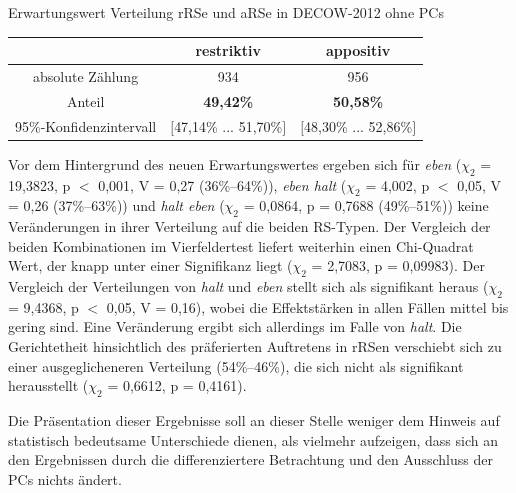 \begin{exe}
	\ex\label{805}Erwartungswert Verteilung rRSe und aRSe in DECOW-2012 ohne PCs\\[-1em]		
 		\begin{tabular}[t]{|c|c|c|} 
 		\hline 	
   	 	& \textbf{restriktiv} & \textbf{appositiv} \\
   	 	\hline 
  		absolute Zählung & 934 & 956\\ 
   		\hline
   		Anteil & \textbf{49,42\%} & \textbf{50,58\%}\\
   		\hline
   		95\%-Konfidenzintervall & $[$47,14\% ... 51,70\%$]$ & $[$48,30\% ... 52,86\%$]$ \\
   		\hline
 		\end{tabular}
\end{exe}
Vor dem Hintergrund des neuen Erwartungswertes ergeben sich für \textit{eben} ($\chi_{2}$ = 19,3823, p $<$ 0,001, V = 0,27 (36\%–64\%)), \textit{eben halt} ($\chi_{2}$ = 4,002, p $<$ 0,05, V = 0,26 (37\%–63\%)) und \textit{halt eben} ($\chi_{2}$ = 0,0864, p = 0,7688 (49\%–51\%)) keine Veränderungen in ihrer Verteilung auf die beiden RS-Typen. Der Vergleich der beiden Kombinationen im Vierfeldertest liefert weiterhin einen Chi-Quadrat Wert, der knapp unter einer Signifikanz liegt ($\chi_{2}$ = 2,7083, p = 0,09983). Der Vergleich der Verteilungen von \textit{halt} und \textit{eben} stellt sich als signifikant heraus ($\chi_{2}$ = 9,4368, p $<$ 0,05, V = 0,16), wobei die Effektstärken in allen Fällen mittel bis gering sind. Eine Veränderung ergibt sich allerdings im Falle von \textit{halt}. Die Gerichtetheit hinsichtlich des präferierten Auftretens in rRSen verschiebt sich zu einer ausgeglicheneren Verteilung (54\%–46\%), die sich nicht als signifikant herausstellt ($\chi_{2}$ = 0,6612, p = 0,4161). 

Die Präsentation dieser Ergebnisse soll an dieser Stelle weniger dem Hinweis auf statistisch bedeutsame Unterschiede dienen, als vielmehr aufzeigen, dass sich an den Ergebnissen durch die differenziertere Betrachtung und den Ausschluss der PCs nichts ändert.

